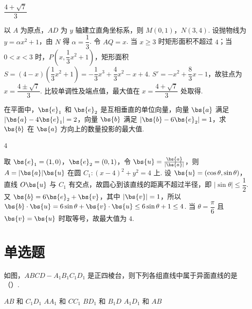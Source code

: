 \begin{answer}
\(\dfrac{4+\sqrt7}{3}\)
\end{answer}

\begin{solution}
以 \(A\) 为原点，\(AD\) 为 \(y\) 轴建立直角坐标系，则 \(M(0,1)\)，\(N(3,4)\). 设抛物线为 \(y=\alpha x^2+1\)，由 \(N\) 得 \(\alpha=\dfrac13\). 令 \(AQ=x\). 当 \(x\ge3\) 时矩形面积不超过 \(4\)；当 \(0<x<3\) 时，\(P\left(x,\dfrac13x^2+1\right)\)，矩形面积
\(S=(4-x)\left(\dfrac13x^2+1\right)=-\dfrac13x^3+\dfrac43x^2-x+4\).
\(S'=-x^2+\dfrac83x-1\)，故驻点为 \(x=\dfrac{4\pm\sqrt7}{3}\). 比较单调性及端点值，最大值在 \(x=\dfrac{4+\sqrt7}{3}\) 处取得.
\end{solution}

\begin{problem}
在平面中，\(\bs{e}_1\) 和 \(\bs{e}_2\) 是互相垂直的单位向量，向量 \(\bs{a}\) 满足 \(|\bs{a}-4\bs{e}_1|=2\)，向量 \(\bs{b}\) 满足 \(|\bs{b}-6\bs{e}_2|=1\)，求 \(\bs{b}\) 在 \(\bs{a}\) 方向上的数量投影的最大值\fillinblank{}.
\end{problem}

\begin{answer}
\(4\)
\end{answer}

\begin{solution}
取 \(\bs{e}_1=(1,0)\)，\(\bs{e}_2=(0,1)\)，令 \(\bs{u}=\frac{\bs{a}}{|\bs{a}|}\)，则 \(A=|\bs{a}|\bs{u}\) 在圆 \(C_1:(x-4)^2+y^2=4\) 上. 设 \(\bs{u}=(\cos\theta,\sin\theta)\)，直线 \(O\bs{u}\) 与 \(C_1\) 有交点，故圆心到该直线的距离不超过半径，即 \(|\sin\theta|\le\dfrac12\). 又 \(\bs{b}=6\bs{e}_2+\bs{v}\)，其中 \(|\bs{v}|=1\)，所以
\(\bs{b}\cdot\bs{u}=6\sin\theta+\bs{v}\cdot\bs{u}\le6\sin\theta+1\le4\).
当 \(\theta=\dfrac\pi6\) 且 \(\bs{v}=\bs{u}\) 时取等号，故最大值为 \(4\).
\end{solution}

\section{单选题}

\begin{problem}
如图，\(ABCD-A_1B_1C_1D_1\) 是正四棱台，则下列各组直线中属于异面直线的是（\quad）.

\choices
    {\(AB\) 和 \(C_1D_1\)}
    {\(AA_1\) 和 \(CC_1\)}
    {\(BD_1\) 和 \(B_1D\)}
    {\(A_1D_1\) 和 \(AB\)}
\end{problem}

